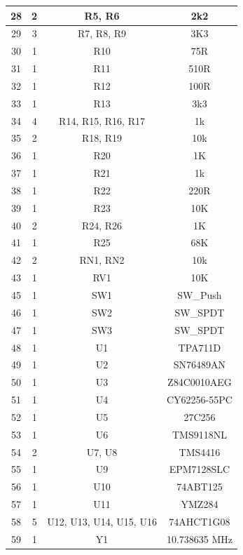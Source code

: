 \begin{footnotesize}
\begin{longtable}{ |*{4}{c|} }
\hline
{28} & {2} & {R5, R6} & {2k2} \\
\hline
{29} & {3} & {R7, R8, R9} & {3K3} \\
\hline
{30} & {1} & {R10} & {75R} \\
\hline
{31} & {1} & {R11} & {510R} \\
\hline
{32} & {1} & {R12} & {100R} \\
\hline
{33} & {1} & {R13} & {3k3} \\
\hline
{34} & {4} & {R14, R15, R16, R17} & {1k} \\
\hline
{35} & {2} & {R18, R19} & {10k} \\
\hline
{36} & {1} & {R20} & {1K} \\
\hline
{37} & {1} & {R21} & {1k} \\
\hline
{38} & {1} & {R22} & {220R} \\
\hline
{39} & {1} & {R23} & {10K} \\
\hline
{40} & {2} & {R24, R26} & {1K} \\
\hline
{41} & {1} & {R25} & {68K} \\
\hline
{42} & {2} & {RN1, RN2} & {10k} \\
\hline
{43} & {1} & {RV1} & {10K} \\
\hline
{45} & {1} & {SW1} & {SW\_Push} \\
\hline
{46} & {1} & {SW2} & {SW\_SPDT} \\
\hline
{47} & {1} & {SW3} & {SW\_SPDT} \\
\hline
{48} & {1} & {U1} & {TPA711D} \\
\hline
{49} & {1} & {U2} & {SN76489AN} \\
\hline
{50} & {1} & {U3} & {Z84C0010AEG} \\
\hline
{51} & {1} & {U4} & {CY62256-55PC} \\
\hline
{52} & {1} & {U5} & {27C256} \\
\hline
{53} & {1} & {U6} & {TMS9118NL} \\
\hline
{54} & {2} & {U7, U8} & {TMS4416} \\
\hline
{55} & {1} & {U9} & {EPM7128SLC} \\
\hline
{56} & {1} & {U10} & {74ABT125} \\
\hline
{57} & {1} & {U11} & {YMZ284} \\
\hline
{58} & {5} & {U12, U13, U14, U15, U16} & {74AHCT1G08} \\
\hline
{59} & {1} & {Y1} & {10.738635 MHz} \\
\hline
\end{longtable}
\end{footnotesize}

